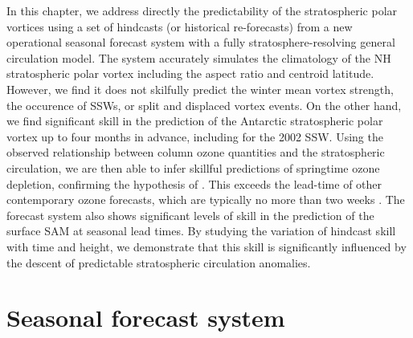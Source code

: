 
In this chapter, we address directly the predictability of the stratospheric
polar vortices using a set of hindcasts (or historical re-forecasts) from a new
operational seasonal forecast system with a fully stratosphere-resolving general
circulation model. The system accurately simulates the climatology of the NH
stratospheric polar vortex including the aspect ratio and centroid
latitude. However, we find it does not skilfully predict the winter mean vortex
strength, the occurence of SSWs, or split and displaced vortex events. On the
other hand, we find significant skill in the prediction of the Antarctic
stratospheric polar vortex up to four months in advance, including for the 2002
SSW. Using the observed relationship between column ozone quantities and the
stratospheric circulation, we are then able to infer skillful predictions of
springtime ozone depletion, confirming the hypothesis of \citet{Salby2012}. This
exceeds the lead-time of other contemporary ozone forecasts, which are typically
no more than two weeks \citep{Eskes2005}. The forecast system also shows
significant levels of skill in the prediction of the surface SAM at seasonal
lead times. By studying the variation of hindcast skill with time and height, we
demonstrate that this skill is significantly influenced by the descent of
predictable stratospheric circulation anomalies.

\section{Seasonal forecast system}
\label{sec:seas-forec-syst}

